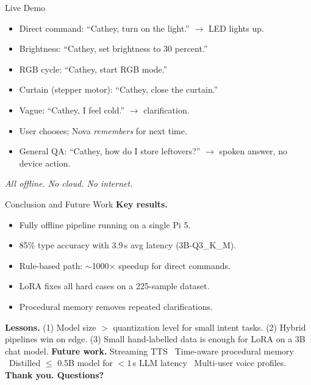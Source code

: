\documentclass[aspectratio=169]{beamer}
\begin{document}
\begin{frame}{Live Demo}
\begin{itemize}
\item Direct command: ``Cathey, turn on the light.'' $\rightarrow$ LED lights up.
\item Brightness: ``Cathey, set brightness to 30 percent.''
\item RGB cycle: ``Cathey, start RGB mode.''
\item Curtain (stepper motor): ``Cathey, close the curtain.''
\item Vague: ``Cathey, I feel cold.'' $\rightarrow$ clarification.
\item User chooses; Nova \emph{remembers} for next time.
\item General QA: ``Cathey, how do I store leftovers?'' $\rightarrow$ spoken answer, no device action.
\end{itemize}
\vspace{0.5em}
\centering
\textit{All offline. No cloud. No internet.}
\end{frame}

\begin{frame}{Conclusion and Future Work}
\textbf{Key results.}
\begin{itemize}
\item Fully offline pipeline running on a single Pi 5.
\item 85\% type accuracy with 3.9\,s avg latency (3B-Q3\_K\_M).
\item Rule-based path: $\sim$1000$\times$ speedup for direct commands.
\item LoRA fixes all hard cases on a 225-sample dataset.
\item Procedural memory removes repeated clarifications.
\end{itemize}
\vspace{0.4em}
\textbf{Lessons.} (1) Model size $>$ quantization level for small intent tasks. (2) Hybrid pipelines win on edge. (3) Small hand-labelled data is enough for LoRA on a 3B chat model.
\vspace{0.4em}
\textbf{Future work.} Streaming TTS \textbullet\ Time-aware procedural memory \textbullet\ Distilled $\le$ 0.5B model for $<1$\,s LLM latency \textbullet\ Multi-user voice profiles.
\vspace{0.6em}
\centering
\textbf{Thank you. Questions?}
\end{frame}
\end{document}
